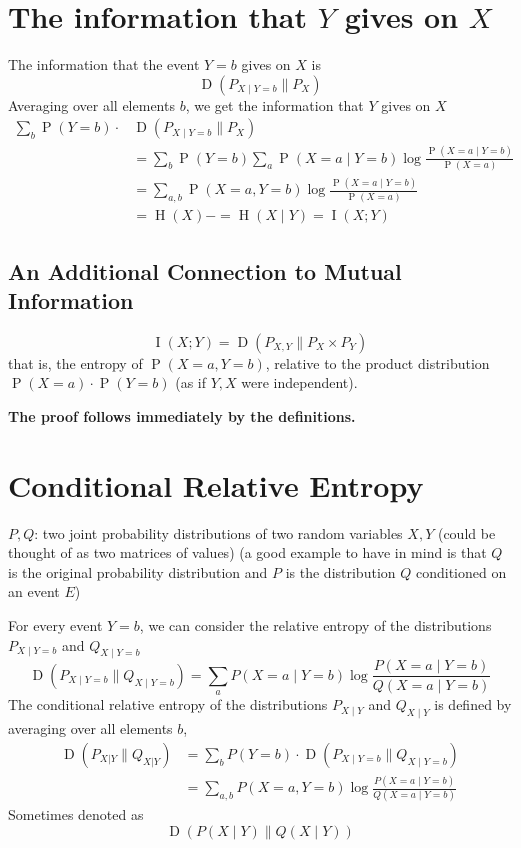 \documentclass{article}
\begin{document}
\section{The information that $Y$ gives on $X$}

The information that the event $Y=b$ gives on $X$ is 
\[
\operatorname{D}\left(P_{X\mid Y=b}\| P_X\right)
\]
Averaging over all elements $b$, we get the information that $Y$ gives on $X$
\begin{align*}
    \sum_{b} \operatorname{P}\left(Y=b\right)\cdot & \operatorname{D}\left(P_{X\mid Y=b}\| P_X\right)\\
     &= \sum_b \operatorname{P}\left(Y=b\right)\sum_a \operatorname{P}\left(X=a\mid Y=b\right)\log \frac{\operatorname{P}\left(X=a\mid Y=b\right)}{\operatorname{P}\left(X=a\right)}\\
    &= \sum_{a,b} \operatorname{P}\left(X=a, Y=b\right)\log \frac{\operatorname{P}\left(X=a\mid Y=b\right)}{\operatorname{P}\left(X=a\right)}\\
    &= \operatorname{H}(X) -= \operatorname{H}(X\mid Y)=\operatorname{I}(X;Y)
\end{align*}

\subsection{An Additional Connection to Mutual Information}

\[
\operatorname{I}(X;Y) = \operatorname{D}\left(P_{X,Y}\| P_X \times P_Y\right)
\]
that is, the entropy of $\operatorname{P}\left(X=a,Y=b\right)$, relative to the product distribution $\operatorname{P}\left(X=a\right)\cdot \operatorname{P}\left(Y=b\right)$ (as if $Y,X$ were independent).

\textbf{The proof follows immediately by the definitions.}

\section{Conditional Relative Entropy}

$P,Q$: two joint probability distributions of two random variables $X,Y$ (could be thought of as two matrices of values) (a good example to have in mind is that $Q$ is the original probability distribution and $P$ is the distribution $Q$ conditioned on an event $E$)

For every event $Y=b$, we can consider the relative entropy of the distributions $P_{X\mid Y=b}$ and $Q_{X\mid Y=b}$
\[
\operatorname{D}\left(P_{X\mid Y=b}\| Q_{X\mid Y=b}\right)=\sum_a P(X=a\mid Y=b)\log \frac{P(X=a\mid Y=b)}{Q(X=a\mid Y=b)}
\]
The conditional relative entropy of the distributions $P_{X\mid Y}$ and $Q_{X\mid Y}$ is defined by averaging over all elements $b$,
\begin{align*}
    \operatorname{D}\left(P_{X|Y}\| Q_{X|Y}\right) &= \sum_b P(Y=b)\cdot \operatorname{D}\left(P_{X\mid Y=b}\| Q_{X\mid Y=b}\right)\\
    &= \sum_{a,b} P(X=a, Y=b)\log \frac{P(X=a\mid Y=b)}{Q(X=a\mid Y=b)}
\end{align*}
Sometimes denoted as 
\[
\operatorname{D}\left(P(X\mid Y)\| Q(X\mid Y)\right)
\]
\end{document}

